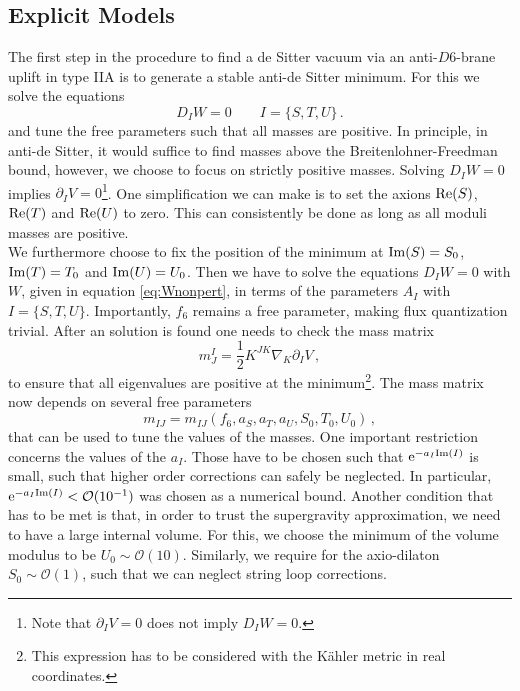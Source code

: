 \documentclass[12pt]{report}
\newcommand{\be}{\begin{equation}}
\newcommand{\ee}{\end{equation}}
\def\rme{{\rm e}}
\def\rmre{{\rm Re}}
\def\rmim{{\rm Im}}
\begin{document}
\subsection{Explicit Models}
\label{sec:uplfitbraneexamples}
The first step in the procedure to find a de Sitter vacuum via an anti-$D6$-brane uplift in type IIA is to generate a stable anti-de Sitter minimum. For this we solve the equations
\be 
D_I W = 0 \qquad I = \{S,T,U\}\,.
\ee
and tune the free parameters such that all masses are positive. In principle, in anti-de Sitter, it would suffice to find masses above the Breitenlohner-Freedman bound, however, we choose to focus on strictly positive masses. Solving $D_I W = 0$ implies $\partial_I V=0$\footnote{Note that $\partial_I V=0$ does not imply $D_I W = 0$.}. One simplification we can make is to set the axions $\rmre(S)$, $\rmre(T)$ and $\rmre(U)$ to zero. This can consistently be done as long as all moduli masses are positive.\\
We furthermore choose to fix the position of the minimum at $\rmim (S) = S_0$, $\rmim (T) = T_0$ and $\rmim (U) = U_0$. Then we have to solve the equations $D_IW = 0$ with $W$, given in equation \eqref{eq:Wnonpert}, in terms of the parameters $A_I$ with $I = \{S,T,U\}$. Importantly, $f_6$ remains a free parameter, making flux quantization trivial. After an solution is found one needs to check the mass matrix
\be 
m_J^I = \frac{1}{2} K^{JK} \nabla_K \partial_I V\,,
\ee 
to ensure that all eigenvalues are positive at the minimum\footnote{This expression has to be considered with the Kähler metric in real coordinates.}. The mass matrix now depends on several free parameters
\be 
m_{IJ} = m_{IJ}(f_6,a_S,a_T,a_U,S_0,T_0,U_0)\,,
\ee
that can be used to tune the values of the masses. One important restriction concerns the values of the $a_I$. Those have to be chosen such that $\rme^{-a_I \rmim (I)}$ is small, such that higher order corrections can safely be neglected. In particular, $\rme^{-a_I \rmim (I)} < \mathcal{O}(10^{-1})$ was chosen as a numerical bound. Another condition that has to be met is that, in order to trust the supergravity approximation, we need to have a large internal volume. For this, we choose the minimum of the volume modulus to be $U_0 \sim \mathcal{O}(10)$. Similarly, we require for the axio-dilaton $S_0 \sim \mathcal{O}(1)$, such that we can neglect string loop corrections.\\
\end{document}
